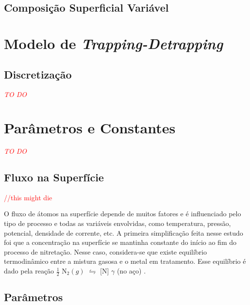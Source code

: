 \documentclass[]{politex}
\newcommand\myworries[1]{\textcolor{red}{#1}}
\begin{document}
\subsection{Composição Superficial Variável}
\label{sec:sol-numerica-2alei2}




\section{Modelo de \textit{Trapping-Detrapping}}
\label{sec:my-trapdetrap}


\subsection{Discretização}


\myworries{\textit{TO DO}}

\section{Parâmetros e Constantes}
\label{sec:params}
\myworries{\textit{TO DO}}
\subsection{Fluxo na Superfície}
\myworries{//this might die}

O fluxo de átomos na superfície depende de muitos fatores e é influenciado pelo tipo de processo e todas as variáveis envolvidas, como temperatura, pressão, potencial, densidade de corrente, etc.
A primeira simplificação feita nesse estudo foi que a concentração na superfície se mantinha constante do início ao fim do processo de nitretação. Nesse caso, considera-se que existe equilíbrio termodinâmico entre a  mistura gasosa e o metal em tratamento. Esse equilíbrio é dado pela reação $\frac{1}{2}$ N${_2(g)}$ $\leftrightharpoons$ [N] $\gamma$ (no aço) \cite{tschiptschin2000thermodynamics}.

\subsection{Parâmetros}
\label{params_sub}

\end{document}
